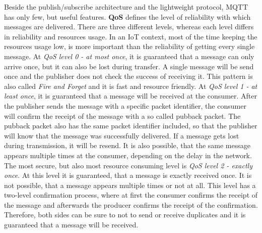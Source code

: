 Beside the publish/subscribe architecture and the lightweight protocol, \ac{MQTT} has only few, but useful features.
\textbf{\ac{QoS}} defines the level of reliability with which messages are delivered.\autocite[cf.]{Bayer:MQTT}
There are three different levels, whereas each level differs in reliability and resources usage.\autocite[cf.]{Bayer:MQTT}
In an \ac{IoT} context, most of the time keeping the resources usage low, is more important than the reliability of getting every single message.\newline
At \textit{\ac{QoS} level 0 - at most once}, it is guaranteed that a message can only arrive once, but it can also be lost during transfer.
A single message will be send once and the publisher does not check the success of receiving it.
This pattern is also called \textit{Fire and Forget} and it is fast and resource friendly.\autocite[cf.]{Bayer:MQTT}\newline
At \textit{\ac{QoS} level 1 - at least once}, it is guaranteed that a message will be received at the consumer.
After the publisher sends the message with a specific packet identifier, the consumer will confirm the receipt of the message with a so called pubback packet.
The pubback packet also has the same packet identifier included, so that the publisher will know that the message was successfully delivered.
If a message gets lost during transmission, it will be resend.
It is also possible, that the same message appears multiple times at the consumer, depending on the delay in the network.\newline
The most secure, but also most resource consuming level is \textit{\ac{QoS} level 2 - exactly once}.
At this level it is guaranteed, that a message is exactly received once.
It is not possible, that a message appears multiple times or not at all.
This level has a two-level confirmation process, where at first the consumer confirms the receipt of the message and afterwards the producer confirms the receipt of the confirmation.
Therefore, both sides can be sure to not to send or receive duplicates and it is guaranteed that a message will be received.


